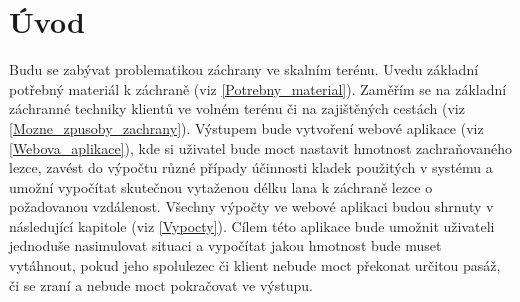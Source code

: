 \chapter*{Úvod}
\label{Uvod}
\def\figurename{Obr.} %
\def\tablename{Tab.} %
\def\figureautorefname{obr.} %
\def\tableautorefname{tab.} %
\def\chapterautorefname{kapitola} %
Budu se zabývat problematikou záchrany ve skalním terénu. Uvedu základní potřebný materiál k záchraně (viz \autoref{Potrebny_material}). Zaměřím se na základní záchranné techniky klientů ve volném terénu či na zajištěných cestách (viz \autoref{Mozne_zpusoby_zachrany}). Výstupem bude vytvoření webové aplikace (viz \autoref{Webova_aplikace}), kde si uživatel bude moct nastavit hmotnost zachraňovaného lezce, zavést do výpočtu různé případy účinnosti kladek použitých v systému a umožní vypočítat skutečnou vytaženou délku lana k záchraně lezce o požadovanou vzdálenost. Všechny výpočty ve webové aplikaci budou shrnuty v následující kapitole (viz \autoref{Vypocty}). Cílem této aplikace bude umožnit uživateli jednoduše nasimulovat situaci a vypočítat jakou hmotnost bude muset vytáhnout, pokud jeho spolulezec či klient nebude moct překonat určitou pasáž, či se zraní a nebude moct pokračovat ve výstupu.